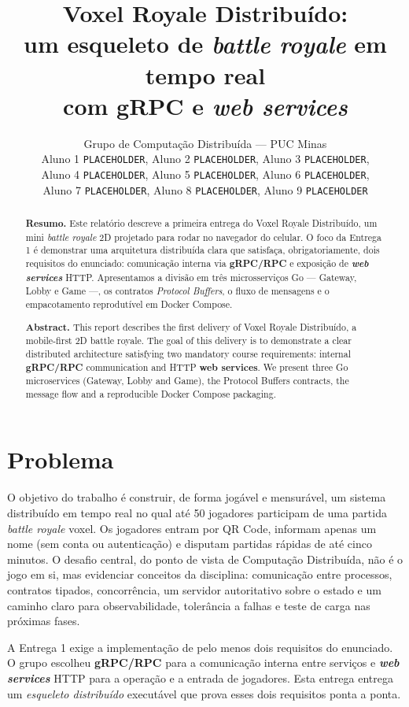 \documentclass[12pt]{article}
\title{\textbf{Voxel Royale Distribuído:\\ um esqueleto de \textit{battle royale} em tempo real\\ com gRPC e \textit{web services}}}
\author{
Grupo de Computação Distribuída --- PUC Minas\\
\small Aluno 1 \texttt{PLACEHOLDER}, Aluno 2 \texttt{PLACEHOLDER}, Aluno 3 \texttt{PLACEHOLDER},\\
\small Aluno 4 \texttt{PLACEHOLDER}, Aluno 5 \texttt{PLACEHOLDER}, Aluno 6 \texttt{PLACEHOLDER},\\
\small Aluno 7 \texttt{PLACEHOLDER}, Aluno 8 \texttt{PLACEHOLDER}, Aluno 9 \texttt{PLACEHOLDER}
}
\date{}
\begin{document}
\maketitle

\begin{abstract}
\noindent\textbf{Resumo.} Este relatório descreve a primeira entrega do Voxel Royale
Distribuído, um mini \textit{battle royale} 2D projetado para rodar no navegador do
celular. O foco da Entrega 1 é demonstrar uma arquitetura distribuída clara que satisfaça,
obrigatoriamente, dois requisitos do enunciado: comunicação interna via \textbf{gRPC/RPC} e
exposição de \textbf{\textit{web services}} HTTP. Apresentamos a divisão em três
microsserviços Go --- Gateway, Lobby e Game ---, os contratos \textit{Protocol Buffers}, o
fluxo de mensagens e o empacotamento reprodutível em Docker Compose.

\vspace{0.6em}
\noindent\textbf{Abstract.} This report describes the first delivery of Voxel Royale
Distribuído, a mobile-first 2D battle royale. The goal of this delivery is to
demonstrate a clear distributed architecture satisfying two mandatory course requirements:
internal \textbf{gRPC/RPC} communication and HTTP \textbf{web services}. We present three Go
microservices (Gateway, Lobby and Game), the Protocol Buffers contracts, the message flow and
a reproducible Docker Compose packaging.
\end{abstract}

\section{Problema}

O objetivo do trabalho é construir, de forma jogável e mensurável, um sistema distribuído em
tempo real no qual até 50 jogadores participam de uma partida \textit{battle royale} voxel. Os
jogadores entram por QR Code, informam apenas um nome (sem conta ou autenticação) e disputam
partidas rápidas de até cinco minutos. O desafio central, do ponto de vista de Computação
Distribuída, não é o jogo em si, mas evidenciar conceitos da disciplina: comunicação entre
processos, contratos tipados, concorrência, um servidor autoritativo sobre o estado e um
caminho claro para observabilidade, tolerância a falhas e teste de carga nas próximas fases.

A Entrega 1 exige a implementação de pelo menos dois requisitos do enunciado. O grupo escolheu
\textbf{gRPC/RPC} para a comunicação interna entre serviços e \textbf{\textit{web services}}
HTTP para a operação e a entrada de jogadores. Esta entrega entrega um \textit{esqueleto
distribuído} executável que prova esses dois requisitos ponta a ponta.
\end{document}
